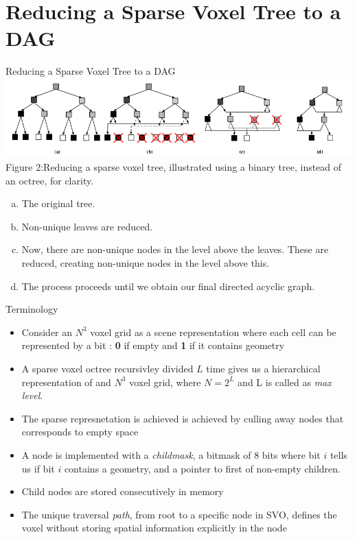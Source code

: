\documentclass{beamer}
\begin{document}
\section{Reducing a Sparse Voxel Tree to a DAG}
\begin{frame}{Reducing a Sparse Voxel Tree to a DAG}
	\includegraphics[scale=0.37]{fig2}{ Figure 2:Reducing a sparse voxel tree, illustrated using a binary tree, instead of an octree, for clarity.}
	\begin{enumerate}[a.]
		\item{The original tree.}
		\item{Non-unique leaves are reduced.}
		\item{Now, there are non-unique nodes in the level above the leaves. These are reduced, creating non-unique nodes in the level above this.}
		\item{The process proceeds until we obtain our final directed acyclic graph.}
	\end{enumerate}
\end{frame}

\begin{frame}{Terminology}
	\begin{itemize}
		\item{
		Consider an $N^3$ voxel grid as a scene representation where each cell can be represented by a bit : \textbf{0} if empty and \textbf{1} if it contains geometry
		}
		\item{
			A sparse voxel octree recursivley divided $L$ time gives us a hierarchical representation of and $N^3$ voxel grid, where $N = 2^L$ and L is called as \textit{max level}.
		}
		\item{
			The sparse represnetation is achieved is achieved by culling away nodes that corresponds to empty space
		}
		\item{
			A node is implemented with a \textit{childmask}, a bitmask of 8 bits where bit $i$ tells us if bit $i$  contains a geometry, and a pointer to first of non-empty children.
		}
		\item{
			Child nodes are stored consecutively in memory	
		}
		\item{
			The unique traversal \textit{path}, from root to a specific node in SVO, defines the voxel without storing spatial information explicitly in the node 
		}
	\end{itemize}
\end{frame}
\end{document}
